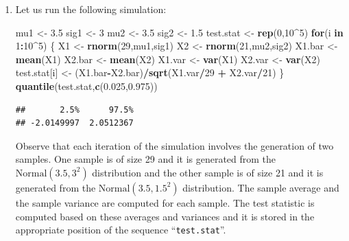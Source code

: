 \documentclass[]{krantz}
\makeatletter
\newenvironment{Shaded}{\begin{snugshade}}{\end{snugshade}}
\newcommand{\KeywordTok}[1]{\textcolor[rgb]{0.13,0.29,0.53}{\textbf{#1}}}
\newcommand{\DecValTok}[1]{\textcolor[rgb]{0.00,0.00,0.81}{#1}}
\newcommand{\FloatTok}[1]{\textcolor[rgb]{0.00,0.00,0.81}{#1}}
\newcommand{\StringTok}[1]{\textcolor[rgb]{0.31,0.60,0.02}{#1}}
\newcommand{\ControlFlowTok}[1]{\textcolor[rgb]{0.13,0.29,0.53}{\textbf{#1}}}
\newcommand{\OperatorTok}[1]{\textcolor[rgb]{0.81,0.36,0.00}{\textbf{#1}}}
\newcommand{\NormalTok}[1]{#1}
\newenvironment{kframe}{%
\medskip{}
\setlength{\fboxsep}{.8em}
 \def\at@end@of@kframe{}%
 \ifinner\ifhmode%
  \def\at@end@of@kframe{\end{minipage}}%
  \begin{minipage}{\columnwidth}%
 \fi\fi%
 \def\FrameCommand##1{\hskip\@totalleftmargin \hskip-\fboxsep
 \colorbox{shadecolor}{##1}\hskip-\fboxsep
     \hskip-\linewidth \hskip-\@totalleftmargin \hskip\columnwidth}%
 \MakeFramed {\advance\hsize-\width
   \@totalleftmargin\z@ \linewidth\hsize
   \@setminipage}}%
 {\par\unskip\endMakeFramed%
 \at@end@of@kframe}
\renewenvironment{Shaded}{\begin{kframe}}{\end{kframe}}
\theoremstyle{definition}
\theoremstyle{definition}
\theoremstyle{definition}
\theoremstyle{remark}
\makeatother
\begin{document}
\begin{enumerate}
\def\labelenumi{\arabic{enumi}.}
\item
  Let us run the following simulation:

\begin{Shaded}
\begin{Highlighting}[]
\NormalTok{mu1 <-}\StringTok{ }\FloatTok{3.5}
\NormalTok{sig1 <-}\StringTok{ }\DecValTok{3}
\NormalTok{mu2 <-}\StringTok{ }\FloatTok{3.5}
\NormalTok{sig2 <-}\StringTok{ }\FloatTok{1.5}
\NormalTok{test.stat <-}\StringTok{ }\KeywordTok{rep}\NormalTok{(}\DecValTok{0}\NormalTok{,}\DecValTok{10}\OperatorTok{^}\DecValTok{5}\NormalTok{)}
\ControlFlowTok{for}\NormalTok{(i }\ControlFlowTok{in} \DecValTok{1}\OperatorTok{:}\DecValTok{10}\OperatorTok{^}\DecValTok{5}\NormalTok{) \{}
\NormalTok{  X1 <-}\StringTok{ }\KeywordTok{rnorm}\NormalTok{(}\DecValTok{29}\NormalTok{,mu1,sig1)}
\NormalTok{  X2 <-}\StringTok{ }\KeywordTok{rnorm}\NormalTok{(}\DecValTok{21}\NormalTok{,mu2,sig2)}
\NormalTok{  X1.bar <-}\StringTok{ }\KeywordTok{mean}\NormalTok{(X1)}
\NormalTok{  X2.bar <-}\StringTok{ }\KeywordTok{mean}\NormalTok{(X2)}
\NormalTok{  X1.var <-}\StringTok{ }\KeywordTok{var}\NormalTok{(X1)}
\NormalTok{  X2.var <-}\StringTok{ }\KeywordTok{var}\NormalTok{(X2)}
\NormalTok{  test.stat[i] <-}\StringTok{ }\NormalTok{(X1.bar}\OperatorTok{-}\NormalTok{X2.bar)}\OperatorTok{/}\KeywordTok{sqrt}\NormalTok{(X1.var}\OperatorTok{/}\DecValTok{29} \OperatorTok{+}\StringTok{ }\NormalTok{X2.var}\OperatorTok{/}\DecValTok{21}\NormalTok{)}
\NormalTok{\}}
\KeywordTok{quantile}\NormalTok{(test.stat,}\KeywordTok{c}\NormalTok{(}\FloatTok{0.025}\NormalTok{,}\FloatTok{0.975}\NormalTok{))}
\end{Highlighting}
\end{Shaded}

\begin{verbatim}
##       2.5%      97.5% 
## -2.0149997  2.0512367
\end{verbatim}

  Observe that each iteration of the simulation involves the generation
  of two samples. One sample is of size 29 and it is generated from the
  \(\mathrm{Normal}(3.5,3^2)\) distribution and the other sample is of
  size 21 and it is generated from the \(\mathrm{Normal}(3.5,1.5^2)\)
  distribution. The sample average and the sample variance are computed
  for each sample. The test statistic is computed based on these
  averages and variances and it is stored in the appropriate position of
  the sequence ``\texttt{test.stat}''.


\end{enumerate}
\end{document}
